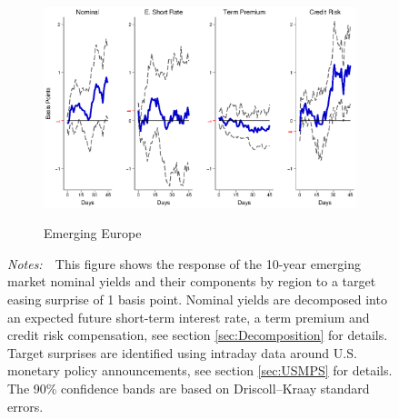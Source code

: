 \documentclass[a4paper, 12pt]{article}
\newcommand{\figtext}[1]{
	\vspace{-1ex}
	\captionsetup{justification=justified,font=footnotesize}
	\caption*{#1}
}
\newcommand{\fignotes}[1]{\figtext{\emph{Notes:~}~#1}}
\begin{document}
\begin{appendices}
\begin{landscape}
\begin{figure}[tbph]
\begin{center}
\begin{minipage}{\linewidth}
\begin{center}
						\begin{subfigure}[t]{\linewidth}
							\includegraphics[trim={0cm 0cm 0cm 0cm},clip,height=0.35\textheight,width=\linewidth]{../Figures/TargetEEnomyptpphi120m.eps} \\
							\vspace{-0.35cm}
							\caption{Emerging Europe} \label{subfig:LPEE10Ytarget}
						\end{subfigure}
						\vspace{-0.45cm}
					\end{center}
					\fignotes{This figure shows the response of the 10-year emerging market nominal yields and their components by region to a target easing surprise of 1 basis point. Nominal yields are decomposed into an expected future short-term interest rate, a term premium and credit risk compensation, see section \ref{sec:Decomposition} for details. Target surprises are identified using intraday data around U.S. monetary policy announcements, see section \ref{sec:USMPS} for details. The 90\% confidence bands are based on Driscoll--Kraay standard errors.}
				\end{minipage}
			\end{center}
		\end{figure}
		
		\pagebreak[4]
		

\end{landscape}
\end{appendices}
\end{document}
